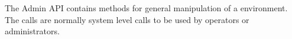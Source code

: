 The Admin API contains methods for general manipulation of a \Rapture environment. The calls are normally
system level calls to be used by operators or administrators.
